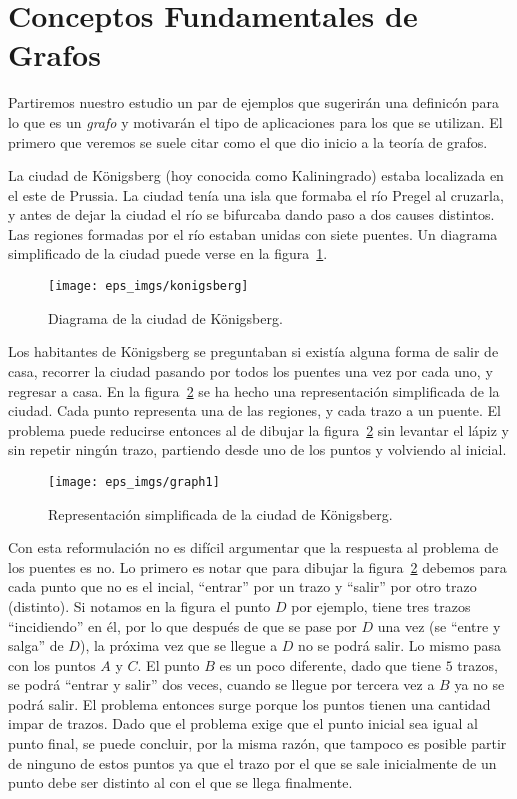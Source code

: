 \section{Conceptos Fundamentales de Grafos}

Partiremos nuestro estudio un par de ejemplos que sugerirán una definicón para lo que es un \emph{grafo} y motivarán el tipo de aplicaciones para los que se utilizan.
El primero que veremos se suele citar como el que dio inicio a la teoría de grafos.

\begin{ejemplo}
La ciudad de K\"onigsberg (hoy conocida como Kaliningrado) estaba localizada en el este de Prussia.
La ciudad tenía una isla que formaba el río Pregel al cruzarla, y antes de dejar la ciudad el río se bifurcaba dando paso a dos causes distintos.
Las regiones formadas por el río estaban unidas con siete puentes.
Un diagrama simplificado de la ciudad puede verse en la figura~\ref{fig:konigsberg}.

\begin{figure}[h!]
\centering
\texttt{[image: eps\_imgs/konigsberg]}
\caption{Diagrama de la ciudad de K\"onigsberg.}
\label{fig:konigsberg}
\end{figure}

Los habitantes de K\"onigsberg se preguntaban si existía alguna forma de salir de casa, recorrer la ciudad pasando por todos los puentes una vez por cada uno, y regresar a casa.
En la figura~\ref{fig:graph1} se ha hecho una representación simplificada de la ciudad.
Cada punto representa una de las regiones, y cada trazo a un puente.
El problema puede reducirse entonces al de dibujar la figura~\ref{fig:graph1} sin levantar el lápiz y sin repetir ningún trazo, partiendo desde uno de los puntos y volviendo al inicial.

\begin{figure}[h!]
\centering
\texttt{[image: eps\_imgs/graph1]}
\caption{Representación simplificada de la ciudad de K\"onigsberg.}
\label{fig:graph1}
\end{figure}

Con esta reformulación no es difícil argumentar que la respuesta al problema de los puentes es no.
Lo primero es notar que para dibujar la figura~\ref{fig:graph1} debemos para cada punto que no es el incial, ``entrar'' por un trazo y ``salir'' por otro trazo (distinto).
Si notamos en la figura el punto $D$ por ejemplo, tiene tres trazos ``incidiendo'' en él, por lo que después de que se pase por $D$ una vez (se ``entre y salga'' de $D$), la próxima vez que se llegue a $D$ no se podrá salir.
Lo mismo pasa con los puntos $A$ y $C$.
El punto $B$ es un poco diferente, dado que tiene $5$ trazos, se podrá ``entrar y salir'' dos veces, cuando se llegue por tercera vez a $B$ ya no se podrá salir.
El problema entonces surge porque los puntos tienen una cantidad impar de trazos.
Dado que el problema exige que el punto inicial sea igual al punto final, se puede concluir, por la misma razón, que tampoco es posible partir de ninguno de estos puntos ya que el trazo por el que se sale inicialmente de un punto debe ser distinto al con el que se llega finalmente.


\end{ejemplo}
